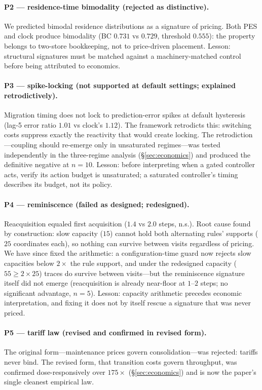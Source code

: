 \documentclass[10pt,twocolumn]{article}
\theoremstyle{definition}
\newcommand{\PES}{PES}
\begin{document}
\paragraph{P2 --- residence-time bimodality (rejected as distinctive).}
We predicted bimodal residence distributions as a signature of pricing. Both \PES{} and clock produce
bimodality ({BC} $0.731$ vs $0.729$, threshold $0.555$): the property belongs to two-store bookkeeping, not
to price-driven placement. Lesson: structural signatures must be matched against a machinery-matched
control before being attributed to economics.

\paragraph{P3 --- spike-locking (not supported at default settings; explained retrodictively).}
Migration timing does not lock to prediction-error spikes at default hysteresis (lag-5 error ratio $1.01$
vs clock's $1.12$). The framework retrodicts this: switching costs suppress exactly the reactivity that
would create locking. The retrodiction---coupling should re-emerge only in unsaturated regimes---was tested
independently in the three-regime analysis (\S\ref{sec:economics}) and produced the definitive negative at
$n{=}10$. Lesson: before interpreting when a gated controller acts, verify its action budget is
unsaturated; a saturated controller's timing describes its budget, not its policy.

\paragraph{P4 --- reminiscence (failed as designed; redesigned).}
Reacquisition equaled first acquisition ($1.4$ vs $2.0$ steps, n.s.). Root cause found by construction:
slow capacity ($15$) cannot hold both alternating rules' supports ($25$ coordinates each), so nothing can
survive between visits regardless of pricing. We have since fixed the arithmetic: a configuration-time
guard now rejects slow capacities below $2\times$ the rule support, and under the redesigned capacity
($55\ge 2\times25$) traces do survive between visits---but the reminiscence signature itself did not
emerge (reacquisition is already near-floor at $1$--$2$ steps; no significant advantage, $n{=}5$).
Lesson: capacity arithmetic precedes economic interpretation, and fixing it does not by itself rescue a
signature that was never priced.

\paragraph{P5 --- tariff law (revised and confirmed in revised form).}
The original form---maintenance prices govern consolidation---was rejected: tariffs never bind. The revised
form, that transition costs govern throughput, was confirmed dose-responsively over $175\times$
(\S\ref{sec:economics}) and is now the paper's single cleanest empirical law.
\end{document}
